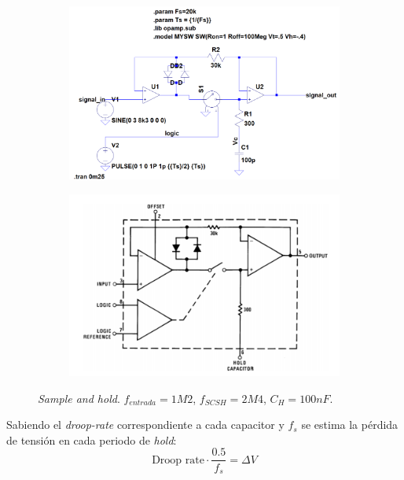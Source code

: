 \documentclass[../../ASSD_TP1_G7.tex]{subfiles}
\begin{document}
\begin{figure}[H]
	\centering
	\begin{subfigure}[t]{0.45\linewidth}
		\includegraphics[width=\textwidth]{figures/ltspice_sim.png}
		\label{fig:syh_lt_spice}
	\end{subfigure}
	\begin{subfigure}[t]{0.45\linewidth}
		\includegraphics[width=\textwidth]{figures/block_diagram_datasheet.png}
		\label{fig:syh_block_diagram_datasheet}
	\end{subfigure}
	\caption{\textit{Sample and hold}. $f_{entrada} = 1M2$, $f_{SCSH}=2M4$, $C_H = 100nF$.}
	\label{fig:syh_block_diagram_sim}
\end{figure}


Sabiendo el \textit{droop-rate} correspondiente a cada capacitor y $f_s$ se estima la p\'erdida de tensi\'on en cada periodo de \textit{hold}:
\[ \text{Droop rate} \cdot \frac{0.5}{f_s} = \Delta V\]
\end{document}
